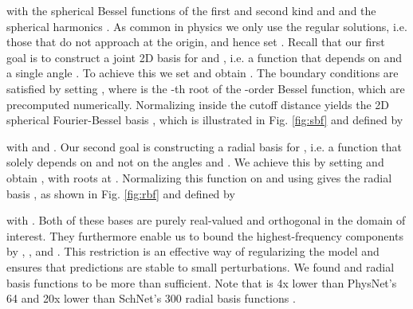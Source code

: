 \documentclass{article} \usepackage{iclr2020_conference,times}
\begin{document}
with the spherical Bessel functions of the first and second kind  and  and the spherical harmonics . As common in physics we only use the regular solutions, i.e. those that do not approach  at the origin, and hence set . Recall that our first goal is to construct a joint 2D basis for  and , i.e. a function that depends on  and a single angle . To achieve this we set  and obtain . The boundary conditions are satisfied by setting , where  is the \mbox{-th} root of the \mbox{-order} Bessel function, which are precomputed numerically. Normalizing  inside the cutoff distance  yields the 2D spherical Fourier-Bessel basis , which is illustrated in Fig. \ref{fig:sbf} and defined by

with  and . Our second goal is constructing a radial basis for , i.e. a function that solely depends on  and not on the angles  and . We achieve this by setting  and obtain , with roots at . Normalizing this function on  and using  gives the radial basis , as shown in Fig. \ref{fig:rbf} and defined by

with . Both of these bases are purely real-valued and orthogonal in the domain of interest. They furthermore enable us to bound the highest-frequency components by , , and . This restriction is an effective way of regularizing the model and ensures that predictions are stable to small perturbations. We found  and  radial basis functions to be more than sufficient. Note that  is 4x lower than PhysNet's 64 \citep{unke_physnet:_2019} and 20x lower than SchNet's 300 radial basis functions \citep{schutt_schnet:_2017}.
\end{document}
